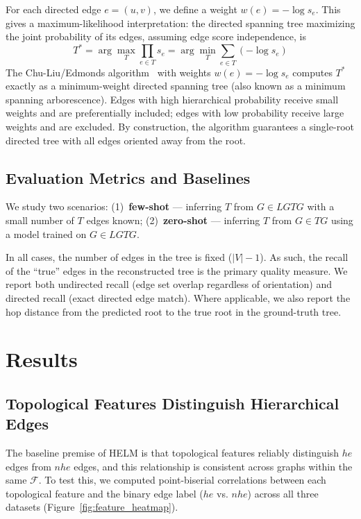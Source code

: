 \documentclass{article}
\begin{document}
    For each directed edge $e=(u,v)$, we define a weight $w(e) = -\log s_{e}$. This gives a maximum-likelihood interpretation: the directed spanning tree maximizing the joint probability of its edges, assuming edge score independence, is
    \begin{equation}
        T^{*} = \arg\max_{T}\prod_{e\in T}s_{e} = \arg\min_{T}\sum_{e\in T}(-\log s_{e})
    \end{equation}
    The Chu-Liu/Edmonds algorithm~\citep{chu1965shortest,edmonds1967optimum} with weights $w(e)=-\log s_{e}$ computes $T^{*}$ exactly as a minimum-weight directed spanning tree (also known as a minimum spanning arborescence). Edges with high hierarchical probability receive small weights and are preferentially included; edges with low probability receive large weights and are excluded. By construction, the algorithm guarantees a single-root directed tree with all edges oriented away from the root.


    \subsection{Evaluation Metrics and Baselines}
    We study two scenarios: (1)~\textbf{few-shot} --- inferring $T$ from $G \in LGTG$ with a small number of $T$ edges known; (2)~\textbf{zero-shot} --- inferring $T$ from $G \in TG$ using a model trained on $G \in LGTG$.

    In all cases, the number of edges in the tree is fixed ($|V| - 1$). As such, the recall of the ``true'' edges in the reconstructed tree is the primary quality measure. We report both undirected recall (edge set overlap regardless of orientation) and directed recall (exact directed edge match). Where applicable, we also report the hop distance from the predicted root to the true root in the ground-truth tree.

    \section{Results}
    \subsection{Topological Features Distinguish Hierarchical Edges}
    The baseline premise of HELM is that topological features reliably distinguish $he$ edges from $nhe$ edges, and this relationship is consistent across graphs within the same $\mathcal{F}$. To test this, we computed point-biserial correlations between each topological feature and the binary edge label ($he$ vs. $nhe$) across all three datasets (Figure~\ref{fig:feature_heatmap}).
\end{document}
